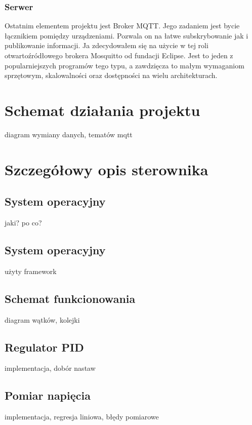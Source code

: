 \documentclass[eng, 11pt, twoside, openany]{mgr}
\begin{document}
      \subsection{Serwer}
        Ostatnim elementem projektu jest Broker MQTT. Jego zadaniem jest
        bycie łącznikiem pomiędzy urządzeniami. Pozwala on na łatwe
        subskrybowanie jak i publikowanie informacji. Ja zdecydowałem się 
        na użycie w tej roli otwartoźródłowego brokera Mosquitto od fundacji 
        Eclipse. Jest to jeden z popularniejszych programów tego typu, a
        zawdzięcza to małym wymaganiom sprzętowym, skalowalności oraz
        dostępności na wielu architekturach. 
        

  \chapter{Schemat działania projektu}
        diagram wymiany danych, tematów mqtt 

  \chapter{Szczegółowy opis sterownika}
    \section{System operacyjny}
      jaki? po co? 

    \section{System operacyjny}
      użyty framework

        
    \section{Schemat funkcionowania}
      diagram wątków, kolejki

    \section{Regulator PID}
      implementacja, dobór nastaw

    \section{Pomiar napięcia}
      implementacja, regresja liniowa, błędy pomiarowe
\end{document}
